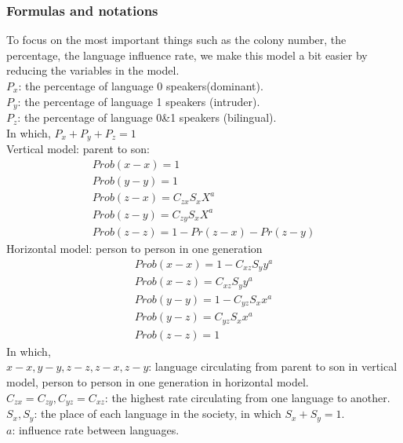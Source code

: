 \documentclass{mcmthesis}
\begin{document}
\subsubsection{Formulas and notations}
\hspace*{8mm}To focus on the most important things such as the colony number, the percentage, the language influence rate, we make this model a bit easier by reducing the variables in the model.\\
$P_x$: the percentage of language 0 speakers(dominant).\\
$P_y$: the percentage of language 1 speakers (intruder).\\
$P_z$: the percentage of language 0\&1 speakers (bilingual).\\
In which, $P_x+P_y+P_z=1$ \\
Vertical model: parent to son:
\begin{eqnarray}
Prob(x-x)=1 \\
Prob(y-y)=1 \\ 
Prob(z-x)=C_{zx} S_x X^a \\
Prob(z-y)=C_{zy} S_x X^a \\
Prob(z-z)=1-Pr(z-x)-Pr(z-y)
\end{eqnarray}
Horizontal model: person to person in one generation
\begin{eqnarray}
Prob(x-x)=1-C_{xz} S_y y^a \\
Prob(x-z)=C_{xz} S_y y^a \\
Prob(y-y)=1-C_{yz} S_x x^a \\
Prob(y-z)=C_{yz} S_x x^a \\
Prob(z-z)=1
\end{eqnarray}
In which, \\
$x-x,y-y,z-z,z-x,z-y$: language circulating from parent to son in vertical model, person to person in one generation in horizontal model.\\
$C_{zx}=C_{zy}, C_{yz}=C_{xz}$: the highest rate circulating from one language to another.\\
$S_x, S_y$: the place of each language in the society, in which $S_x + S_y = 1$. \\
$a$: influence rate between languages.
\end{document}
